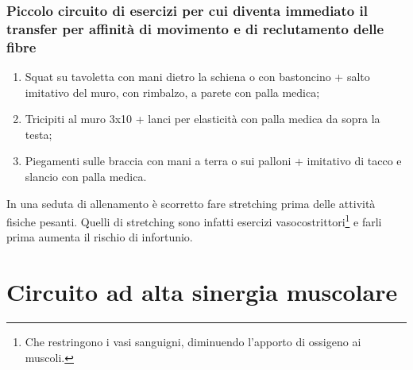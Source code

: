\subsubsection{
Piccolo circuito di esercizi per cui diventa immediato il transfer per affinità di movimento e di reclutamento delle fibre}
\begin{enumerate}
\item Squat su tavoletta con mani dietro la schiena o con bastoncino + salto imitativo del muro, con
rimbalzo, a parete con palla medica;
\item Tricipiti al muro 3x10 + lanci per elasticità con palla medica da sopra la testa;
\item Piegamenti sulle braccia con mani a terra o sui palloni + imitativo di tacco e slancio con palla
medica.
\end{enumerate}

\begin{ross}
In una seduta di allenamento è scorretto fare stretching prima delle attività
fisiche pesanti. Quelli di stretching sono infatti esercizi
vasocostrittori\footnote{Che restringono i vasi sanguigni, diminuendo l'apporto
di ossigeno ai muscoli.} e farli prima aumenta il rischio di infortunio.
\end{ross}

\section{Circuito ad alta sinergia muscolare}
